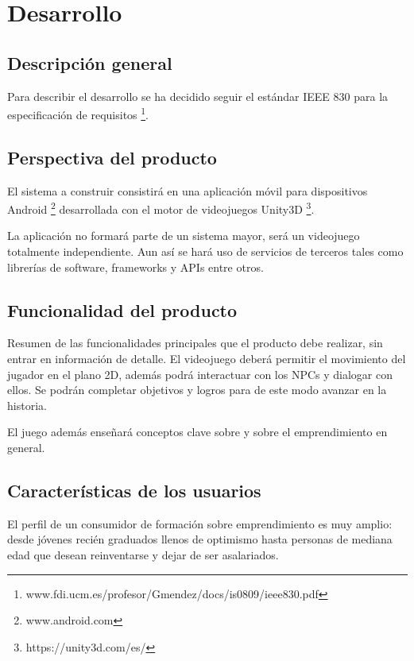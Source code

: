 \chapter{Desarrollo}

\section{Descripción general}

Para describir el desarrollo se ha decidido seguir el estándar IEEE 830 para la especificación de requisitos \footnote{www.fdi.ucm.es/profesor/Gmendez/docs/is0809/ieee830.pdf}.

\section{Perspectiva del producto}

El sistema a construir consistirá en una aplicación móvil para dispositivos Android \footnote{www.android.com} desarrollada con el motor de videojuegos Unity3D \footnote{https://unity3d.com/es/}. 

La aplicación no formará parte de un sistema mayor, será un videojuego totalmente independiente. Aun así se hará uso de servicios de terceros tales como librerías de software, frameworks y APIs entre otros.

\section{Funcionalidad del producto}

Resumen de las funcionalidades principales que el producto debe realizar, sin entrar en información de detalle.
El videojuego deberá permitir el movimiento del jugador en el plano 2D, además podrá interactuar con los NPCs y dialogar con ellos. Se podrán completar objetivos y logros para de este modo avanzar en la historia.

El juego además enseñará conceptos clave sobre  y sobre el emprendimiento en general.

\section{Características de los usuarios}

El perfil de un consumidor de formación sobre emprendimiento es muy amplio: desde jóvenes recién graduados llenos de optimismo hasta personas de mediana edad que desean reinventarse y dejar de ser asalariados. 


